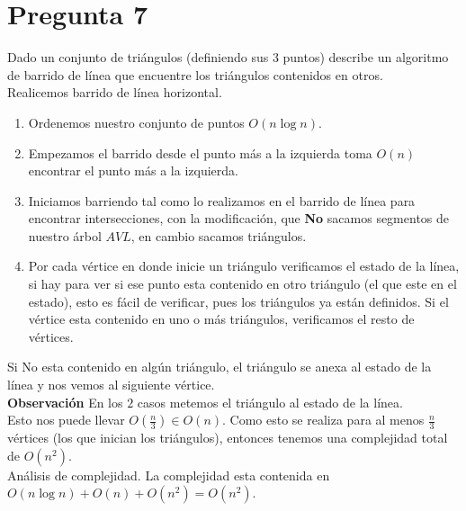 \large\section*{Pregunta 7}\Large

Dado un conjunto de triángulos (definiendo sus 3 puntos) describe un algoritmo 
de barrido de línea que encuentre los triángulos contenidos en otros.\\

Realicemos barrido de línea horizontal.

\begin{enumerate}
    \item Ordenemos nuestro conjunto de puntos $O(n\log n)$.
    \item Empezamos el barrido desde el punto más a la izquierda toma $O(n)$
    encontrar el punto más a la izquierda.
    \item Iniciamos barriendo tal como lo realizamos en el barrido de línea para
    encontrar intersecciones, con la modificación, que \textbf{No} sacamos segmentos
    de nuestro árbol $AVL$, en cambio sacamos triángulos.
    \item Por cada vértice en donde inicie un triángulo verificamos el estado de la 
    línea, si hay para ver si ese punto esta contenido en otro triángulo 
    (el que este en el estado), esto es fácil de verificar, pues los triángulos ya
    están definidos. Si el vértice esta contenido en uno o más triángulos, verificamos
    el resto de vértices.
\end{enumerate}

Si No esta contenido en algún triángulo, el triángulo se anexa al estado de la línea
y nos vemos al siguiente vértice.\\

\textbf{Observación} En los $2$ casos metemos el triángulo al estado de la línea.\\

Esto nos puede llevar $O(\frac{n}{3})\in O(n)$. Como esto se realiza para al menos
$\frac{n}{3}$ vértices (los que inician los triángulos), entonces tenemos una complejidad
total de $O(n^2)$.\\

Análisis de complejidad. La complejidad esta contenida en 
$O(n \log n) + O(n) + O(n^2) = O(n^2)$. 
